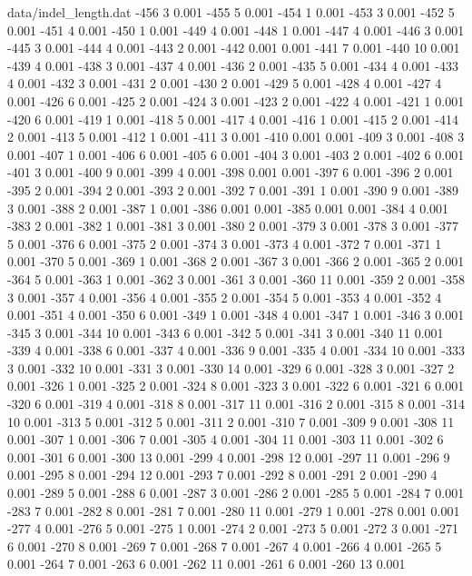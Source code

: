 \begin{filecontents}{data/indel_length.dat}
-456	3	0.001
-455	5	0.001
-454	1	0.001
-453	3	0.001
-452	5	0.001
-451	4	0.001
-450	1	0.001
-449	4	0.001
-448	1	0.001
-447	4	0.001
-446	3	0.001
-445	3	0.001
-444	4	0.001
-443	2	0.001
-442	0.001	0.001
-441	7	0.001
-440	10	0.001
-439	4	0.001
-438	3	0.001
-437	4	0.001
-436	2	0.001
-435	5	0.001
-434	4	0.001
-433	4	0.001
-432	3	0.001
-431	2	0.001
-430	2	0.001
-429	5	0.001
-428	4	0.001
-427	4	0.001
-426	6	0.001
-425	2	0.001
-424	3	0.001
-423	2	0.001
-422	4	0.001
-421	1	0.001
-420	6	0.001
-419	1	0.001
-418	5	0.001
-417	4	0.001
-416	1	0.001
-415	2	0.001
-414	2	0.001
-413	5	0.001
-412	1	0.001
-411	3	0.001
-410	0.001	0.001
-409	3	0.001
-408	3	0.001
-407	1	0.001
-406	6	0.001
-405	6	0.001
-404	3	0.001
-403	2	0.001
-402	6	0.001
-401	3	0.001
-400	9	0.001
-399	4	0.001
-398	0.001	0.001
-397	6	0.001
-396	2	0.001
-395	2	0.001
-394	2	0.001
-393	2	0.001
-392	7	0.001
-391	1	0.001
-390	9	0.001
-389	3	0.001
-388	2	0.001
-387	1	0.001
-386	0.001	0.001
-385	0.001	0.001
-384	4	0.001
-383	2	0.001
-382	1	0.001
-381	3	0.001
-380	2	0.001
-379	3	0.001
-378	3	0.001
-377	5	0.001
-376	6	0.001
-375	2	0.001
-374	3	0.001
-373	4	0.001
-372	7	0.001
-371	1	0.001
-370	5	0.001
-369	1	0.001
-368	2	0.001
-367	3	0.001
-366	2	0.001
-365	2	0.001
-364	5	0.001
-363	1	0.001
-362	3	0.001
-361	3	0.001
-360	11	0.001
-359	2	0.001
-358	3	0.001
-357	4	0.001
-356	4	0.001
-355	2	0.001
-354	5	0.001
-353	4	0.001
-352	4	0.001
-351	4	0.001
-350	6	0.001
-349	1	0.001
-348	4	0.001
-347	1	0.001
-346	3	0.001
-345	3	0.001
-344	10	0.001
-343	6	0.001
-342	5	0.001
-341	3	0.001
-340	11	0.001
-339	4	0.001
-338	6	0.001
-337	4	0.001
-336	9	0.001
-335	4	0.001
-334	10	0.001
-333	3	0.001
-332	10	0.001
-331	3	0.001
-330	14	0.001
-329	6	0.001
-328	3	0.001
-327	2	0.001
-326	1	0.001
-325	2	0.001
-324	8	0.001
-323	3	0.001
-322	6	0.001
-321	6	0.001
-320	6	0.001
-319	4	0.001
-318	8	0.001
-317	11	0.001
-316	2	0.001
-315	8	0.001
-314	10	0.001
-313	5	0.001
-312	5	0.001
-311	2	0.001
-310	7	0.001
-309	9	0.001
-308	11	0.001
-307	1	0.001
-306	7	0.001
-305	4	0.001
-304	11	0.001
-303	11	0.001
-302	6	0.001
-301	6	0.001
-300	13	0.001
-299	4	0.001
-298	12	0.001
-297	11	0.001
-296	9	0.001
-295	8	0.001
-294	12	0.001
-293	7	0.001
-292	8	0.001
-291	2	0.001
-290	4	0.001
-289	5	0.001
-288	6	0.001
-287	3	0.001
-286	2	0.001
-285	5	0.001
-284	7	0.001
-283	7	0.001
-282	8	0.001
-281	7	0.001
-280	11	0.001
-279	1	0.001
-278	0.001	0.001
-277	4	0.001
-276	5	0.001
-275	1	0.001
-274	2	0.001
-273	5	0.001
-272	3	0.001
-271	6	0.001
-270	8	0.001
-269	7	0.001
-268	7	0.001
-267	4	0.001
-266	4	0.001
-265	5	0.001
-264	7	0.001
-263	6	0.001
-262	11	0.001
-261	6	0.001
-260	13	0.001

\end{filecontents}
